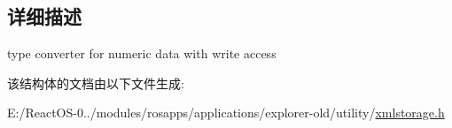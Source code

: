 \subsection{详细描述}
type converter for numeric data with write access 

该结构体的文档由以下文件生成\+:\begin{DoxyCompactItemize}
\item 
E\+:/\+React\+O\+S-\/0../modules/rosapps/applications/explorer-\/old/utility/\hyperlink{xmlstorage_8h}{xmlstorage.\+h}\end{DoxyCompactItemize}

